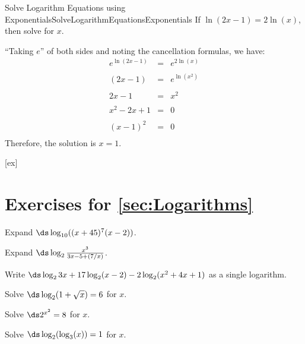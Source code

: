 \begin{example}{Solve Logarithm Equations using Exponentials}{SolveLogarithmEquationsExponentials}
If $\ln(2x-1)=2\ln(x)$, then solve for $x$.
\end{example}

\begin{solution} 
``Taking $e$'' of both sides and noting the cancellation formulas, we have:
$$\begin{array}{rcl}
e^{\ln(2x-1)} & = & e^{2\ln(x)}\\
\\
(2x-1) & = & e^{\ln(x^2)}\\
\\
2x-1 & = & x^2\\
\\
x^2-2x+1 & = & 0\\
\\
(x-1)^2 & = & 0\\
\end{array}$$
Therefore, the solution is $x=1$.
\end{solution}


[ex]
\section*{Exercises for \ref{sec:Logarithms}}

\begin{enumialphparenastyle}

\begin{ex}
Expand $\ds\log_{10} ((x+45)^7 (x-2))$.
\end{ex}

\begin{ex}
Expand $\ds\log_2 {\frac{x^3}{3x-5 +(7/x)}}$.
\end{ex}

\begin{ex}
Write $\ds \log_2 3x + 17 \log_2 (x-2) -
2\log_2 (x^2 + 4x + 1)$ as a single logarithm.
\end{ex}

\begin{ex}
Solve $\ds \log_2 (1+ \sqrt{x} ) = 6$ for  $x$.
\end{ex}

\begin{ex}
Solve $\ds 2^{x^2} = 8$ for $x$.
\end{ex}

\begin{ex}
Solve $\ds \log_2 (\log_3 (x) ) = 1$ for $x$.
\end{ex}

\end{enumialphparenastyle}